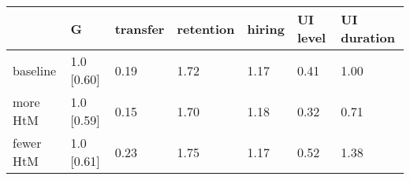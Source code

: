 \begin{tabular}{lllllll}
\toprule
 & \textbf{G} & \textbf{transfer} & \textbf{retention} & \textbf{hiring} & \textbf{UI level} & \textbf{UI duration} \\
\midrule
baseline & 1.0 [0.60] & 0.19 & 1.72 & 1.17 & 0.41 & 1.00 \\
more HtM & 1.0 [0.59] & 0.15 & 1.70 & 1.18 & 0.32 & 0.71 \\
fewer HtM & 1.0 [0.61] & 0.23 & 1.75 & 1.17 & 0.52 & 1.38 \\
\bottomrule
\end{tabular}

